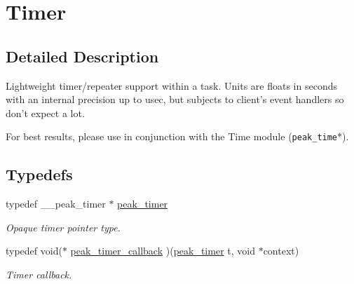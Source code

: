\hypertarget{group__timer}{
\section{Timer}
\label{group__timer}
}


\subsection{Detailed Description}
Lightweight timer/repeater support within a task. Units are floats in seconds with an internal precision up to usec, but subjects to client's event handlers so don't expect a lot.\par
 For best results, please use in conjunction with the Time module ({\tt peak\_\-time$\ast$}). 

\subsection*{Typedefs}
\begin{CompactItemize}
\item 
\hypertarget{group__timer_ga0}{
typedef \_\-\_\-peak\_\-timer $\ast$ \hyperlink{group__timer_ga0}{peak\_\-timer}}
\label{group__timer_ga0}

\begin{CompactList}\small\item\em Opaque timer pointer type. \item\end{CompactList}\item 
\hypertarget{group__timer_ga1}{
typedef void($\ast$ \hyperlink{group__timer_ga1}{peak\_\-timer\_\-callback} )(\hyperlink{group__timer_ga0}{peak\_\-timer} t, void $\ast$context)}
\label{group__timer_ga1}

\begin{CompactList}\small\item\em Timer callback. \item\end{CompactList}\end{CompactItemize}
